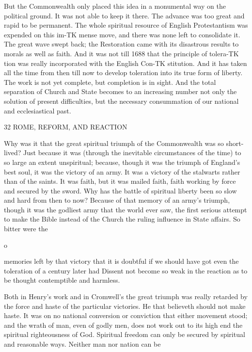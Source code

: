 \documentclass[12pt,a5paper,oneside]{book}
\begin{document}
But the Commonwealth only placed this idea in a 
monumental way on the political ground. It was not 
able to keep it there. The advance was too great and 
rapid to be permanent. The whole spiritual resource 
of English Protestantism was expended on this im-TK
mense move, and there was none left to consolidate it. 
The great wave swept back; the Restoration came 
with its disastrous results to morals as well as faith. 
And it was not till 1688 that the principle of tolera-TK
tion was really incorporated with the English Con-TK
stitution. And it has taken all the time from then till 
now to develop toleration into its true form of liberty. 
The work is not yet complete, but completion is in 
sight. And the total separation of Church and State 
becomes to an increasing number not only the solution 
of present difficulties, but the necessary consummation 
of our national and ecclesiastical past. 



32 ROME, REFORM, AND REACTION 

Why was it that the great spiritual triumph of the 
Commonwealth was so short-lived? Just because it 
was (through the inevitable circumstances of the time) 
to so large an extent unspiritual; because, though it 
was the triumph of England's best soul, it was the 
victory of an army. It was a victory of the stalwarts 
rather than of the saints. It was faith, but it was 
mailed faith, faith working by force and secured by 
the sword. Why has the battle of spiritual liberty 
been so slow and hard from then to now? Because of 
that memory of an army's triumph, though it was the 
godliest army that the world ever saw, the first serious 
attempt to make the Bible instead of the Church the 
ruling influence in State affairs. So bitter were the 

o 

memories left by that victory that it is doubtful if we 
should have got even the toleration of a century later 
had Dissent not become so weak in the reaction as 
to be thought contemptible and harmless. 

Both in Henry's work and in Cromwell's the great 
triumph was really retarded by the force and haste of 
the particular victories. He that believeth should not 
make haste. It was on no national conversion or 
conviction that either movement stood; and the 
wrath of man, even of godly men, does not work out 
to its high end the spiritual righteousness of God. 
Spiritual freedom can only be secured by spiritual and 
reasonable ways. Neither man nor nation can be 
\end{document}
